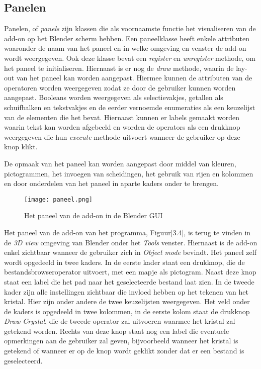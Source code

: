 \subsection{Panelen}
Panelen, of \textit{panels} zijn klassen die als voornaamste functie het visualiseren van de add-on op het Blender scherm hebben. Een paneelklasse heeft enkele attributen waaronder de naam van het paneel en in welke omgeving en venster de add-on wordt weergegeven. Ook deze klasse bevat een \textit{register} en \textit{unregister} methode, om het paneel te initialiseren. Hiernaast is er nog de \textit{draw} methode, waarin de lay-out van het paneel kan worden aangepast. Hiermee kunnen de attributen van de operatoren worden weergegeven zodat ze door de gebruiker kunnen worden aangepast. Booleans worden weergegeven als selectievakjes, getallen als schuifbalken en tekstvakjes en de eerder vernoemde enumeraties als een keuzelijst van de elementen die het bevat. Hiernaast kunnen er labels gemaakt worden waarin tekst kan worden afgebeeld en worden de operators als een drukknop weergegeven die hun \textit{execute} methode uitvoert wanneer de gebruiker op deze knop klikt.
\par
De opmaak van het paneel kan worden aangepast door middel van kleuren, pictogrammen, het invoegen van scheidingen, het gebruik van rijen en kolommen en door onderdelen van het paneel in aparte kaders onder te brengen.
\par
\begin{figure}[H]
\texttt{[image: paneel.png]}
\caption{Het paneel van de add-on in de Blender GUI}
\end{figure}

\newpage
Het paneel van de add-on van het programma, Figuur[3.4], is terug te vinden in de \textit{3D view} omgeving van Blender onder het \textit{Tools} venster. Hiernaast is de add-on enkel zichtbaar wanneer de gebruiker zich in \textit{Object mode} bevindt. Het paneel zelf wordt opgedeeld in twee kaders. In de eerste kader staat een drukknop, die de bestandsbrowseroperator uitvoert, met een mapje als pictogram. Naast deze knop staat een label die het pad naar het geselecteerde bestand laat zien. In de tweede kader zijn alle instellingen zichtbaar die invloed hebben op het tekenen van het kristal. Hier zijn onder andere de twee keuzelijsten weergegeven.  Het veld onder de kaders is opgedeeld in twee kolommen, in de eerste kolom staat de drukknop \textit{Draw Crystal}, die de tweede operator zal uitvoeren waarmee het kristal zal getekend worden. Rechts van deze knop staat nog een label die eventuele opmerkingen aan de gebruiker zal geven, bijvoorbeeld wanneer het kristal is getekend of wanneer er op de knop wordt geklikt zonder dat er een bestand is geselecteerd.




